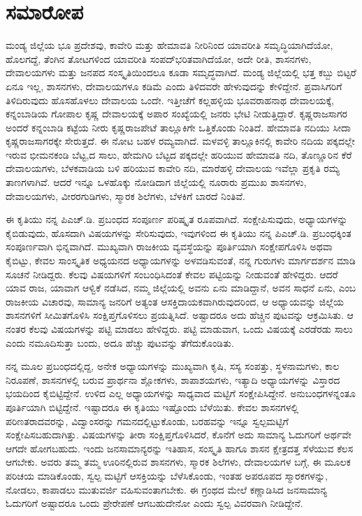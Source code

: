
\chapter{ಸಮಾರೋಪ}

ಮಂಡ್ಯ ಜಿಲ್ಲೆಯ ಭೂ ಪ್ರದೇಶವು, ಕಾವೇರಿ ಮತ್ತು ಹೇಮಾವತಿ ನೀರಿನಿಂದ ಯಾವರೀತಿ ಸಮೃದ್ಧಿಯಾಗಿದೆಯೋ, ಹೊಲಗದ್ದೆ, ತೆಂಗಿನ ತೋಟಗಳಿಂದ ಯಾವರೀತಿ ಸಂಪದ್​ಭರಿತವಾಗಿದೆಯೋ, ಅದೇ ರೀತಿ, ಶಾಸನಗಳು, ದೇವಾಲಯಗಳು ಮತ್ತು ಜನಪದ ಸಂಸ್ಕೃತಿಯಿಂದಲೂ ಕೂಡಾ ಸಮೃದ್ಧವಾಗಿದೆ. ಮಂಡ್ಯ ಜಿಲ್ಲೆಯಲ್ಲಿ ಭತ್ತ ಕಬ್ಬು ಬಿಟ್ಟರೆ ಏನೂ ಇಲ್ಲ, ಶಾಸನಗಳು, ದೇವಾಲಯಗಳೂ ಕಡಿಮೆ ಎಂದು ತಿಳಿದವರೇ ಹೇಳುವುದನ್ನು ಕೇಳಿದ್ದೇನೆ. ಪ್ರವಾಸಿಗರಿಗೆ ತಿಳಿದಿರುವುದು ಹೊಸಹೊಳಲು ದೇವಾಲಯ ಒಂದೇ. ಇತ್ತೀಚೆಗೆ ಕಲ್ಲಹಳ್ಳಿಯ ಭೂವರಾಹನಾಥ ದೇವಾಲಯಕ್ಕೆ, ಕನ್ನಂಬಾಡಿಯ ಗೋಪಾಲ ಕೃಷ್ಣ ದೇವಾಲಯಕ್ಕೆ ಅಪಾರ ಸಂಖ್ಯೆಯಲ್ಲಿ ಜನರು ಭೇಟಿ ನೀಡುತ್ತಿದ್ದಾರೆ. ಕೃಷ್ಣರಾಜಸಾಗರ ಅಂದರೆ ಕನ್ನಂಬಾಡಿ ಕಟ್ಟೆಯ ನೀರು ಕೃಷ್ಣರಾಜಪೇಟೆ ತಾಲ್ಲೂಕಿಗೇ ಒತ್ತಿಕೊಂಡು ನಿಂತಿದೆ. ಹೇಮಾವತಿ ನದಿಯು ಸೀದಾ ಕೃಷ್ಣರಾಜಸಾಗರಕ್ಕೇ ಸೇರುತ್ತದೆ. ಈ ನೋಟ ಬಹಳ ರಮ್ಯವಾಗಿದೆ. ಮಳವಳ್ಳಿ ತಾಲ್ಲೂಕಿನಲ್ಲಿ ಕಾವೇರಿ ನದಿಯ ಪಕ್ಕದಲ್ಲೇ ಇರುವ ಭೀಮನಕಂಡಿ ಬೆಟ್ಟ,ದ ಸಾಲು, ಹೇಮಗಿರಿ ಬೆಟ್ಟದ ಪಕ್ಕದಲ್ಲೇ ಹರಿಯುವ ಹೇಮಾವತಿ ನದಿ, ತೊಣ್ಣೂರಿನ ಕೆರೆ ದೇವಾಲಯಗಳು, ಬೆಳಕವಾಡಿಯ ಬಳಿ ಹರಿಯುವ ಕಾವೇರಿ ನದಿ, ಮಾರೆಹಳ್ಳಿ ದೇವಾಲಯ ಇವೆಲ್ಲಾ ಪ್ರಕೃತಿ ರಮ್ಯ ತಾಣಗಳಾಗಿವೆ. ಆದರೆ ಇನ್ನೂ ಒಳಹೊಕ್ಕು ನೋಡಿದಾಗ ಜಿಲ್ಲೆಯಲ್ಲಿ ನೂರಾರು ಪ್ರಮುಖ ಶಾಸನಗಳು, ದೇವಾಲಯಗಳು, ವೀರರಗುಡಿಗಳು, ಸ್ಮಾರಕ ಶಿಲೆಗಳು, ಬೆಳಕಿಗೆ ಬಾರದೆ ನಿಂತಿವೆ. 

ಈ ಕೃತಿಯು ನನ್ನ ಪಿಎಚ್​.ಡಿ. ಪ್ರಬಂಧದ ಸಂಪೂರ್ಣ ಪರಿಷ್ಕೃತ ರೂಪವಾಗಿದೆ. ಸಂಕ್ಷೇಪಿಸುವುದು, ಅಧ್ಯಾಯಗಳನ್ನು ಕೈಬಿಡುವುದು, ಹೊಸದಾಗಿ ವಿಷಯಗಳನ್ನು ಸೇರಿಸುವುದು, ಇವುಗಳಿಂದ ಈ ಕೃತಿಯು ನನ್ನ ಪಿಎಚ್​.ಡಿ. ಪ್ರಬಂಧಕ್ಕಿಂತ ಸಂಪೂರ್ಣವಾಗಿ ಭಿನ್ನವಾಗಿದೆ. ಮುಖ್ಯವಾಗಿ ರಾಜಕೀಯ ವ್ಯವಸ್ಥೆಯನ್ನು ಪೂರ್ತಿಯಾಗಿ ಸಂಕ್ಷೇಪಗೊಳಿಸಿ ಅಥವಾ ಕೈಬಿಟ್ಟು, ಕೇವಲ ಸಾಂಸ್ಕೃತಿಕ ಅಧ್ಯಯನದ ಅಧ್ಯಾಯಗಳನ್ನು ಅಳವಡಿಸುವಂತೆ, ನನ್ನ ಗುರುಗಳು ಮಾರ್ಗದರ್ಶನ ಮಾಡಿ ಸೂಚನೆ ನೀಡಿದ್ದರು. ಕೆಲವು ವಿಷಯಗಳಿಗೆ ಸಂಬಂಧಿಸಿದಂತೆ ಕೇವಲ ಪಟ್ಟಿಯನ್ನು ನೀಡುವಂತೆ ಹೇಳಿದ್ದರು. ಆದರೆ ಯಾವ ರಾಜ, ಯಾವಾಗ ಆಳ್ವಿಕೆ ನಡೆಸಿದ, ನಮ್ಮ ಜಿಲ್ಲೆಯಲ್ಲಿ ಅವನು ಏನು ಮಾಡಿದ್ದಾನೆ, ಅವನ ಸಾಧನೆ ಏನು, ಎಂಬ ರಾಜಕೀಯ ವಿಚಾರವು, ಸಾಮಾನ್ಯ ಜನರಿಗೆ ಅತ್ಯಂತ ಆಸಕ್ತಿದಾಯಕವಾಗಿರುವುದರಿಂದ, ಆ ಅಧ್ಯಾಯವನ್ನು ಜಿಲ್ಲೆಯ ಶಾಸನಗಳಿಗೆ ಸೀಮಿತಗೊಳಿಸಿ ಸಂಕ್ಷಿಪ್ತಗೊಳಿಸಲು ಪ್ರಯತ್ನಿಸಿದೆ. ಅಷ್ಟಾದರೂ ಅದು ಹೆಚ್ಚಿನ ಪುಟವನ್ನು ಆಕ್ರಮಿಸಿತು. ಆ ನಂತರ ಕೆಲವು ವಿಷಯಗಳನ್ನು ಪಟ್ಟಿ ಮಾಡಲು ಹೇಳಿದ್ದರು. ಪಟ್ಟಿ ಮಾಡುವಾಗ, ಒಂದು ವಿಷಯಕ್ಕೆ ಎರಡೆರಡು ಸಾಲು ಎಂದು ನಮೂದಿಸುತ್ತಾ ಬಂದು, ಅದೂ ಹೆಚ್ಚು ಪುಟವನ್ನು ತೆಗೆದುಕೊಂಡಿತು. 

ನನ್ನ ಮೂಲ ಪ್ರಬಂಧದಲ್ಲಿದ್ದ, ಅನೇಕ ಅಧ್ಯಾಯಗಳನ್ನು ಮುಖ್ಯವಾಗಿ ಕೃಷಿ, ಸಸ್ಯ ಸಂಪತ್ತು, ಸ್ಥಳನಾಮಗಳು, ಕಾಲ ನಿರೂಪಣೆ, ಶಾಸನಗಳಲ್ಲಿ ಬರುವ ಪ್ರಾರ್ಥನಾ ಶ್ಲೋಕಗಳು, ಶಾಪಾಶಯಗಳು, ಇತ್ಯಾದಿ ಅಧ್ಯಾಯಗಳನ್ನು ವಿಸ್ತಾರದ ಭಯದಿಂದ ಕೈಬಿಟ್ಟಿದ್ದೇನೆ. ಉಳಿದ ಎಲ್ಲ ಅಧ್ಯಾಯಗಳನ್ನು ಸಾಧ್ಯವಾದ ಮಟ್ಟಿಗೆ ಸಂಕ್ಷೇಪಿಸಿದ್ದೇನೆ. ಅನುಬಂಧಗಳನ್ನಂತೂ ಪೂರ್ತಿಯಾಗಿ ಬಿಟ್ಟಿದ್ದೇನೆ. ಇಷ್ಟಾದರೂ ಈ ಕೃತಿಯು ಇಷ್ಟೊಂದು ಬೆಳೆಯಿತು. ಕೇವಲ ಶಾಸನಗಳಲ್ಲಿ ಪರಿಣತರಾದವರನ್ನು, ವಿದ್ವಾಂಸರನ್ನು ಗಮನದಲ್ಲಿಟ್ಟುಕೊಂಡು, ಬರಹವನ್ನು ಇನ್ನೂ ಸ್ವಲ್ಪಮಟ್ಟಿಗೆ ಸಂಕ್ಷೇಪಿಸಬಹುದಾಗಿತ್ತು. ವಿಷಯಗಳನ್ನು ತೀರಾ ಸಂಕ್ಷಿಪ್ತಗೊಳಿಸಿದರೆ, ಕೊನೆಗೆ ಅದು ಸಾಮಾನ್ಯ ಓದುಗರಿಗೆ ಅರ್ಥವೇ ಆಗದೇ ಹೋಗಬಹುದು. ಇಂದು ಜನಸಾಮಾನ್ಯರನ್ನು ಇತಿಹಾಸ, ಸಂಸ್ಕೃತಿ ಹಾಗೂ ಶಾಸನ ಕ್ಷೇತ್ರದತ್ತ ಸೆಳೆಯುವ ಕೆಲಸ ಆಗಬೇಕು. ಅವರು ತಮ್ಮ ತಮ್ಮ ಊರಿನಲ್ಲಿರುವ ಶಾಸನಗಳು, ಸ್ಮಾರಕ ಶಿಲೆಗಳು, ದೇವಾಲಯಗಳ ಬಗ್ಗೆ, ಈ ಮೂಲಕ ಪರಿಚಯ ಮಾಡಿಕೊಂಡು, ಸ್ವಲ್ಪ ಮಟ್ಟಿಗೆ ಆಸಕ್ತಿಯನ್ನು ಬೆಳೆಸಿಕೊಂಡು, ಇಂತಹ ಅಪರೂಪದ ಸ್ಮಾರಕಗಳನ್ನು, ನೋಡಲು, ಕಾಪಾಡಲು ಮುತುವರ್ಜಿ ವಹಿಸುವಂತಾಗಬೇಕು. ಈ ಗ್ರಂಥದ ಮೇಲೆ ಕಣ್ಣಾಡಿಸಿದ ಜನಸಾಮಾನ್ಯ ಓದುಗರಿಗೆ ಅಷ್ಟಾದರೂ ಒಂದು ಪ್ರೇರೇಪಣೆ ಆಗಬಹುದೇನೋ ಎಂದು ಸ್ವಲ್ಪ ವಿವರವಾಗಿ ನೀಡಿದ್ದೇನೆ. 

